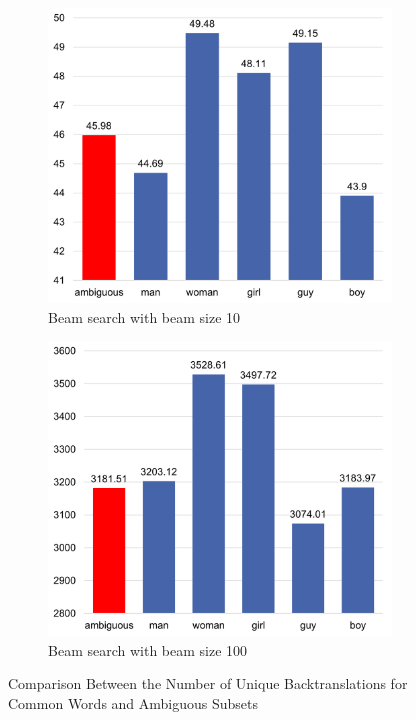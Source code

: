 \begin{figure}[!htb]
     \centering
     
     \begin{subfigure}{0.49\textwidth}
         \centering
         \includegraphics[width=\textwidth]{figures/uniqueness/range_beam_10.png}
         \caption{Beam search with beam size 10}
         \label{fig:uniqueness_range_10}
     \end{subfigure}
     \hfill
     \begin{subfigure}{0.49\textwidth}
         \centering
         \includegraphics[width=\textwidth]{figures/uniqueness/range_beam_100.png}
         \caption{Beam search with beam size 100}
         \label{fig:uniqueness_range_100}
     \end{subfigure}
     
    \caption{Comparison Between the Number of Unique Backtranslations for Common Words and Ambiguous Subsets}
    \label{fig:uniqueness_range}

\end{figure}

